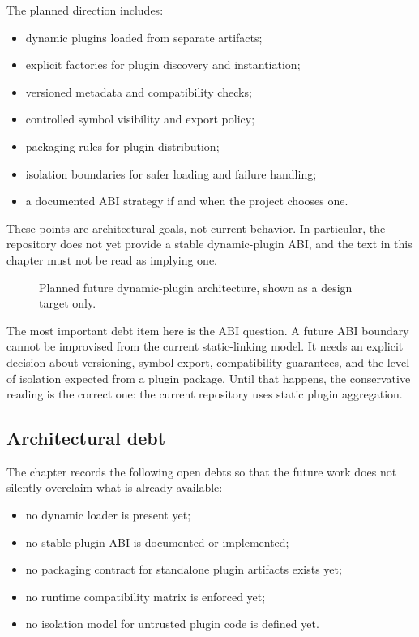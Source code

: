 The planned direction includes:
\begin{itemize}
 \item dynamic plugins loaded from separate artifacts;
 \item explicit factories for plugin discovery and instantiation;
 \item versioned metadata and compatibility checks;
 \item controlled symbol visibility and export policy;
 \item packaging rules for plugin distribution;
 \item isolation boundaries for safer loading and failure handling;
 \item a documented ABI strategy if and when the project chooses one.
\end{itemize}

These points are architectural goals, not current behavior. In particular, the
repository does not yet provide a stable dynamic-plugin ABI, and the text in
this chapter must not be read as implying one.

\begin{figure}[htbp]
\caption{Planned future dynamic-plugin architecture, shown as a design target only.}
\label{fig:plugin-future-dynamic-architecture}
\end{figure}

The most important debt item here is the ABI question. A future ABI boundary
cannot be improvised from the current static-linking model. It needs an
explicit decision about versioning, symbol export, compatibility guarantees,
and the level of isolation expected from a plugin package. Until that happens,
the conservative reading is the correct one: the current repository uses static
plugin aggregation.

\subsection{Architectural debt}
\label{subsec:plugin-architectural-debt}

The chapter records the following open debts so that the future work does not
silently overclaim what is already available:
\begin{itemize}
 \item no dynamic loader is present yet;
 \item no stable plugin ABI is documented or implemented;
 \item no packaging contract for standalone plugin artifacts exists yet;
 \item no runtime compatibility matrix is enforced yet;
 \item no isolation model for untrusted plugin code is defined yet.
\end{itemize}

